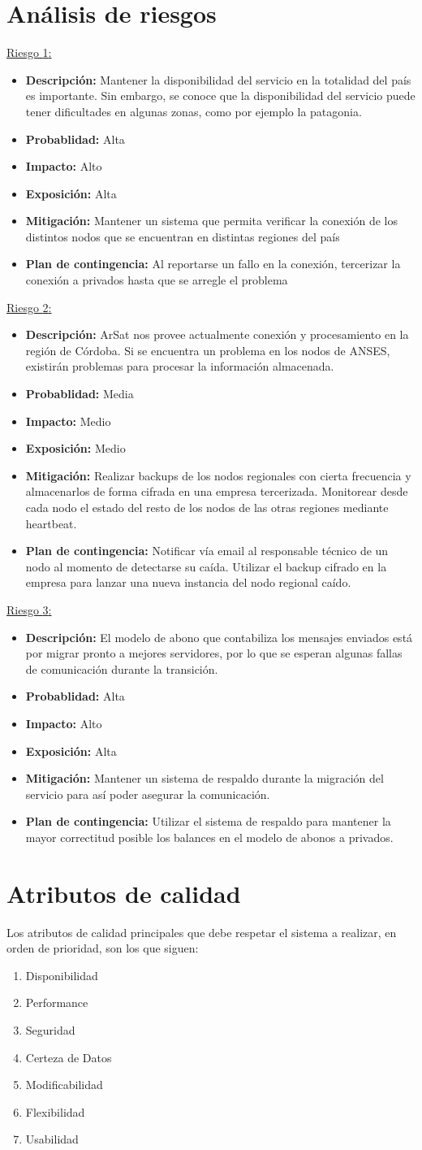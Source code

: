 \documentclass[a4paper, 10pt, twoside]{article}
\newcommand{\riesgo}[7]{
  \underline{Riesgo {#1}:}
  \begin{itemize}   
    \item \textbf{Descripción:} {#2}
    \item \textbf{Probablidad:} {#3}
    \item \textbf{Impacto:} {#4}
    \item \textbf{Exposición:} {#5}
    \item \textbf{Mitigación:} {#6}
    \item \textbf{Plan de contingencia:} {#7}
  \end{itemize}
}
\begin{document}
\section{Análisis de riesgos}
\label{riesgos:r1}
\riesgo{1}
    {Mantener la disponibilidad del servicio en la totalidad del país es importante. Sin embargo, se conoce que la disponibilidad del servicio puede tener dificultades en algunas zonas, como por ejemplo la patagonia.}
    {Alta}
    {Alto}
    {Alta}
    {Mantener un sistema que permita verificar la conexión de los distintos nodos que se encuentran en distintas regiones del país}
    {Al reportarse un fallo en la conexión, tercerizar la conexión a privados hasta que se arregle el problema}

\riesgo{2}
    {ArSat nos provee actualmente conexión y procesamiento en la región de Córdoba. Si se encuentra un problema en los nodos de ANSES, existirán problemas para procesar la información almacenada.}
    {Media}
    {Medio}
    {Medio}
    {Realizar backups de los nodos regionales con cierta frecuencia y almacenarlos de forma cifrada en una empresa tercerizada. Monitorear desde cada nodo el estado del resto de los nodos de las otras regiones mediante heartbeat.}
    {Notificar vía email al responsable técnico de un nodo al momento de detectarse su caída. Utilizar el backup cifrado en la empresa para lanzar una nueva instancia del nodo regional caído.}

\riesgo{3}
    {El modelo de abono que contabiliza los mensajes enviados está por migrar pronto a mejores servidores, por lo que se esperan algunas fallas de comunicación durante la transición.}
    {Alta}
    {Alto}
    {Alta}
    {Mantener un sistema de respaldo durante la migración del servicio para así poder asegurar la comunicación.}
    {Utilizar el sistema de respaldo para mantener la mayor correctitud posible los balances en el modelo de abonos a privados.}

\newpage

\section{Atributos de calidad}

Los atributos de calidad principales que debe respetar el sistema a realizar, en orden de prioridad, son los que siguen:

\begin{enumerate}
\item Disponibilidad
\item Performance
\item Seguridad
\item Certeza de Datos
\item Modificabilidad
\item Flexibilidad
\item Usabilidad
\end{enumerate}
\end{document}
